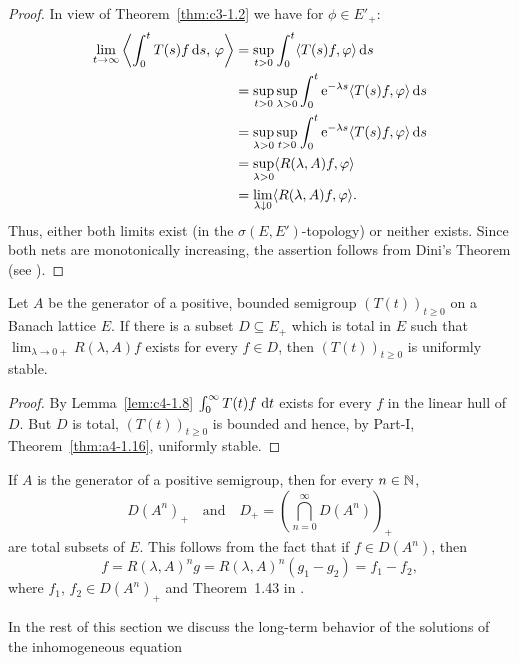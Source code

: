 \begin{proof}
In view of Theorem~\ref{thm:c3-1.2}  we have for $\phi \in E'_{+}$:
\begin{align*}
\lim_{t \to \infty}  \left\langle\int_{0}^{t} T(s)f \ds  ,\,\phi\right\rangle &= \sup_{t>0} \int_{0}^{t}\langle T(s)f,\phi\rangle \ds \\
&= \sup_{t>0}\sup_{\lambda>0} \int_{0}^{t}\eu^{-\lambda s}\langle T(s)f,\phi\rangle \ds \\
&= \sup_{\lambda>0}\sup_{t>0} \int_{0}^{t}\eu^{-\lambda s}\langle T(s)f,\phi\rangle \ds \\
&= \sup_{\lambda>0} \langle R(\lambda,A)f,\phi\rangle \\
&= \lim_{\lambda \downarrow 0} \langle R(\lambda,A)f,\phi\rangle.
\end{align*}
Thus, either both limits exist (in the $\sigma(E,E')$-topology) or neither exists.
Since both nets are monotonically increasing, the assertion follows from Dini's Theorem (see \textcite[II. Theorem~5.9]{schaefer:1974}).
\end{proof}
\begin{proposition}\label{prop:c4-1.9}
%
Let $A$ be the generator of a positive, bounded semigroup $(T(t))_{t \geq 0}$ on a Banach lattice $E$.
If there is a subset $D \subseteq E_{+}$ which is total in $E$ such that $\lim_{\lambda \to 0+} R(\lambda,A)f$ exists for every $f \in D$, then $(T(t))_{t \geq 0}$ is uniformly stable.
\end{proposition}
\begin{proof}
By Lemma~\ref{lem:c4-1.8} $\int_{0}^{\infty} T(t)f \, \mathop{}\!\mathrm{d}{t}$ exists for every $f$ in the linear hull of\/ $D$.
But $D$ is total, $(T(t))_{t \geq 0}$ is bounded and hence, by Part-I, Theorem~\ref{thm:a4-1.16}, uniformly stable.
\end{proof}
\begin{remark}\label{rem:c4-1.10}
If\/ $A$ is the generator of a positive semigroup, then for every $n \in \mathbb{N}$, 
\[
D(A^{n})_{+}
\quad \text{and} \quad 
D_{+} =  \left(\bigcap_{n=0}^{\infty} D(A^{n})\right)_{+}
\]
are total subsets of\/ $E$.
This follows from the fact that if  $f \in D(A^{n})$, then 
\[
    f = R(\lambda,A)^{n}g = R(\lambda,A)^{n}(g_{1} - g_{2}) = f_{1} - f_{2},
\]
where $f_{1}$, $f_{2} \in D(A^{n})_{+}$ and Theorem~1.43 in \textcite{davies:1980}.
\end{remark}
In the rest of this section we discuss the long-term behavior of the solutions of the inhomogeneous equation
